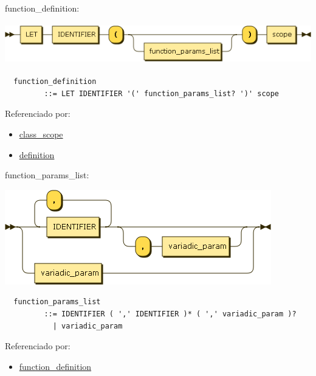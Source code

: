 \begin{minipage}{\textwidth}
  \protect\hypertarget{function_definition}{}{function\_definition:}

  \includegraphics[width=5.97917in,height=0.70833in]{diagram/function_definition.png}

  \begin{verbatim}
  function_definition
         ::= LET IDENTIFIER '(' function_params_list? ')' scope
  \end{verbatim}

  Referenciado por:

  \begin{itemize}
      \tightlist%
    \item
      \protect\hyperlink{class_scope}{class\_scope}
    \item
      \protect\hyperlink{definition}{definition}
  \end{itemize}

\end{minipage}

\begin{minipage}{\textwidth}
  \protect\hypertarget{function_params_list}{}{function\_params\_list:}

  \includegraphics[width=4.56250in,height=1.62500in]{diagram/function_params_list.png}

  \begin{verbatim}
  function_params_list
         ::= IDENTIFIER ( ',' IDENTIFIER )* ( ',' variadic_param )?
           | variadic_param
  \end{verbatim}

  Referenciado por:

  \begin{itemize}
      \tightlist%
    \item
      \protect\hyperlink{function_definition}{function\_definition}
  \end{itemize}

\end{minipage}

